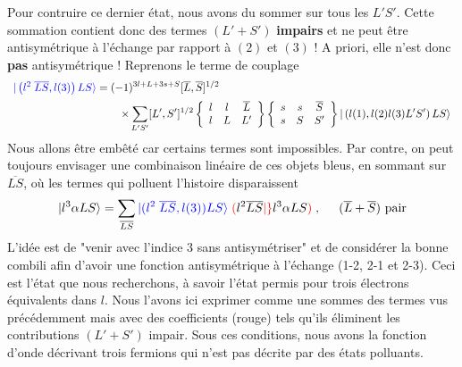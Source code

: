 Pour contruire ce dernier état, nous avons du sommer sur tous les $L'S'$. Cette sommation 
contient donc des termes $(L'+S')$ \textbf{impairs} et ne peut être antisymétrique à l'échange
par rapport à $(2)$ et $(3)$ ! A priori, elle n'est donc \textbf{pas} antisymétrique ! Reprenons
le terme de couplage
\begin{equation}
\begin{array}{l}
\DS{\color{blue}\vert \left( l^{2} \; \overline{L} \overline{S}, l (3) \right) 
L S \rangle }
= (-1)^{3l +L +3s +S} [ \overline{L} , \overline{S} ]^{1/2}\vspace{2mm}\\ \DS
\qquad\qquad\qquad\qquad\qquad\times  \sum_{L' S'} [ L', S' ]^{1/2} 
\left\{ 
\begin{array}{ccc}
l & l & \overline{L} \\
l & L & L'
\end{array}
\right\}
\left\{ 
\begin{array}{ccc}
s & s & \overline{S} \\
s & S & S'
\end{array}
\right\}
\vert \left( l(1), l(2) l(3)  L' S' \right) L S \rangle
\end{array}
\end{equation}
Nous allons être embêté car certains termes sont impossibles. Par contre, on peut toujours
envisager une combinaison linéaire de ces objets bleus, en sommant sur $\overline{LS}$, où 
les termes qui polluent l'histoire disparaissent
\begin{equation}
 \vert l^3 \alpha LS \rangle =
 \sum_{ \overline{L} \overline{S}  } 
 {\color{blue}
\vert ( l^{2} \; \overline{L} \overline{S}, l (3) )
L S \rangle }
\; 
 {\color{red}( } l^{2}  \overline{L} \overline{S} 
{\color{red} \vert \} }
 l^3 \alpha LS {\color{red} )} \; , 
\hspace*{0.5cm} 
(\overline{L} + \overline{S}) ~\mbox{pair}
\label{eq:c}
\end{equation}
L'idée est de "venir avec l'indice 3 sans antisymétriser" et de considérer la bonne combili
afin d'avoir une fonction antisymétrique à l'échange (1-2, 2-1 et 2-3). Ceci est l'état que nous recherchons, à savoir l'état permis pour trois électrons équivalents 
dans $l$. Nous l'avons ici exprimer comme une sommes des termes vus précédemment mais avec des
coefficients (rouge) tels qu'ils éliminent les contributions $(L'+S')$ impair. Sous ces conditions, nous avons la fonction d'onde décrivant trois fermions qui n'est pas 
décrite par des états polluants. \\

